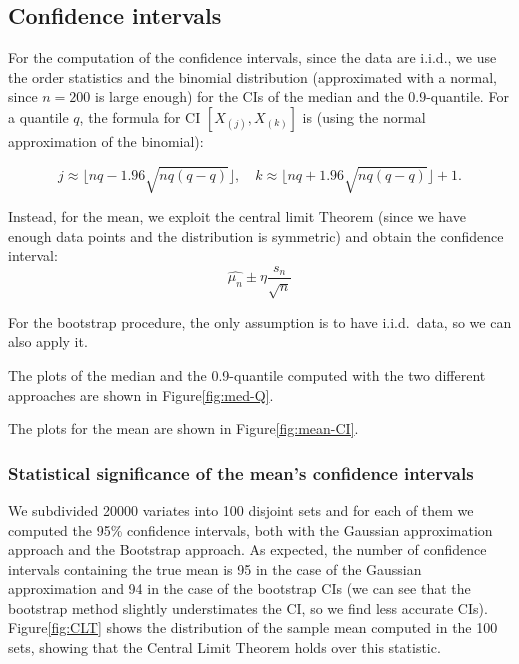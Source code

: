 \documentclass[a4paper,12pt]{article}
\begin{document}
\subsection*{Confidence intervals}
For the computation of the confidence intervals, since the data are i.i.d., we use the order statistics and the binomial distribution (approximated with a normal, since $n=200$ is large enough) for the CIs of the median and the 0.9-quantile.
For a quantile $q$, the formula for CI $[X_{(j)},X_{(k)}]$ is (using the normal approximation of the binomial):

\begin{equation*}
  j \approx \lfloor nq-1.96\sqrt{nq(q-q)} \rfloor, \quad k \approx \lfloor nq+1.96\sqrt{nq(q-q)} \rfloor +1.
\end{equation*}

Instead, for the mean, we exploit the central limit Theorem (since we have enough data points and the distribution is symmetric) and obtain the confidence interval:
\begin{equation*}
  \hat{\mu_n} \pm \eta\frac{s_n}{\sqrt{n}}
\end{equation*}

For the bootstrap procedure, the only assumption is to have i.i.d.\ data, so we can also apply it.

The plots of the median and the 0.9-quantile computed with the two different approaches are shown in Figure\ref{fig:med-Q}.

The plots for the mean are shown in Figure\ref{fig:mean-CI}.

\subsubsection*{Statistical significance of the mean's confidence intervals}

We subdivided 20000 variates into 100 disjoint sets and for each of them we computed the 95\% confidence intervals, both with the Gaussian approximation approach and the Bootstrap approach. As expected, the number of confidence intervals containing the true mean is 95 in the case of the Gaussian approximation and 94 in the case of the bootstrap CIs (we can see that the bootstrap method slightly understimates the CI, so we find less accurate CIs). Figure\ref{fig:CLT} shows the distribution of the sample mean computed in the 100 sets, showing that the Central Limit Theorem holds over this statistic.
\end{document}
